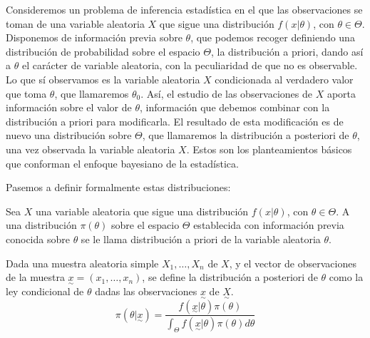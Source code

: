 \documentclass{article}
\begin{document}
Consideremos un problema de inferencia estadística en el que las observaciones se toman de una variable aleatoria $X$ que sigue una distribución $f(x|\theta)$, con $\theta\in\Theta$. Disponemos de información previa sobre $\theta$, que podemos recoger definiendo una distribución de probabilidad sobre el espacio $\Theta$, la distribución a priori, dando así a $\theta$ el carácter de variable aleatoria, con la peculiaridad de que no es observable. Lo que sí observamos es la variable aleatoria $X$ condicionada al verdadero valor que toma $\theta$, que llamaremos $\theta_0$. Así, el estudio de las observaciones de $X$ aporta información sobre el valor de $\theta$, información que debemos combinar con la distribución a priori para modificarla. El resultado de esta modificación es de nuevo una distribución sobre $\Theta$, que llamaremos la distribución a posteriori de $\theta$, una vez observada la variable aleatoria $X$. Estos son los planteamientos básicos que conforman el enfoque bayesiano de la estadística.

Pasemos a definir formalmente estas distribuciones:

\newcommand{\vx}[1]{\underset{\sim}{#1}}

\begin{definition}
	Sea $X$ una variable aleatoria que sigue una distribución $f(x|\theta)$, con $\theta \in \Theta$. A una distribución $\pi(\theta)$ sobre el espacio $\Theta $ establecida con información previa conocida sobre $\theta$ se le llama distribución a priori de la variable aleatoria $\theta$.


	Dada una muestra aleatoria simple $X_1,\dots,X_n$ de $X$, y el vector de observaciones de la muestra $\vx{x}=(x_1,\dots,x_n)$, se define la distribución a posteriori de $\theta$ como la ley condicional de $\theta$ dadas las observaciones $\vx{x}$ de $\vx{X}$.
	\begin{equation*}
		\pi(\theta|\vx{x})= \frac{f(\vx{x}|\theta)\pi(\theta)}{\int_{\Theta}{f(\vx{x}|\theta)\pi(\theta)d\theta}}
	\end{equation*}
\end{definition}
\end{document}

